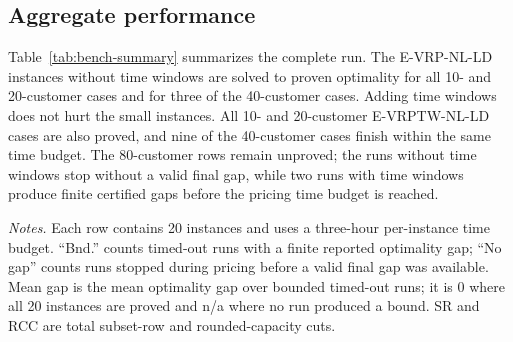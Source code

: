 \documentclass[review,3p,authoryear]{elsarticle}
\theoremstyle{plain}
\theoremstyle{definition}
\theoremstyle{remark}
\begin{document}
\subsection{Aggregate performance}
Table~\ref{tab:bench-summary} summarizes the complete run. The
E-VRP-NL-LD instances without time windows are solved to proven optimality for all
10- and 20-customer cases and for three of the 40-customer cases. Adding time
windows does not hurt the small instances. All 10- and 20-customer
E-VRPTW-NL-LD cases are also proved, and nine of the 40-customer cases finish
within the same time budget. The 80-customer rows remain unproved; the
runs without time windows stop without a valid final gap, while two runs with
time windows produce finite certified gaps before the pricing time budget is
reached.

\begin{table}[!h]
\centering
\caption{Aggregate branch-price-and-cut performance.}
\label{tab:bench-summary}
\vspace{2pt}
\begin{minipage}{0.98\linewidth}
\small
\emph{Notes.} Each row contains 20 instances and uses a three-hour per-instance
time budget. ``Bnd.'' counts timed-out runs with a finite reported optimality gap;
``No gap'' counts runs stopped during pricing before a valid final gap was
available. Mean gap is the mean optimality gap over bounded timed-out runs; it is
\(0\) where all 20 instances are proved and n/a where no run produced a bound. SR
and RCC are total subset-row and rounded-capacity cuts.
\end{minipage}
\end{table}
\end{document}
